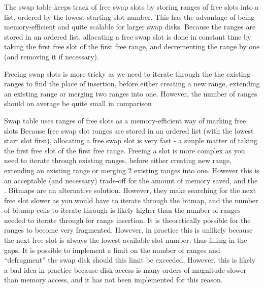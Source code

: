 The swap table keeps track of free swap slots by storing ranges of free slots into a list, ordered by the lowest starting slot number. This has the advantage of being memory-efficient and quite scalable for larger swap disks. Because the ranges are stored in an ordered list, allocating a free swap slot is done in constant time by taking the first free slot of the first free range, and decrementing the range by one (and removing it if necessary).

Freeing swap slots is more tricky as we need to iterate through the the existing ranges to find the place of insertion, before either creating a new range, extending an existing range or merging two ranges into one. However, the number of ranges should on average be quite small in comparison

Swap table
	uses ranges of free slots as a memory-efficient way of marking free slots
	Because free swap slot ranges are stored in an ordered list (with the lowest start slot first), allocating a free swap slot is very fast - a simple matter of taking the first free slot of the first free range.
	Freeing a slot is more complex as you need to iterate through existing ranges, before either creating new range, extending an existing range or merging 2 existing ranges into one. However this is an acceptable (and necessary) trade-off for the amount of memory saved, and the .
	Bitmaps are an alternative solution. However, they make searching for the next free slot slower as you would have to iterate through the bitmap, and the number of bitmap cells to iterate through is likely higher than the number of ranges needed to iterate through for range insertion.
	It is theoretically possible for the ranges to become very fragmented. However, in practice this is unlikely because the next free slot is always the lowest available slot number, thus filling in the gaps. It is possible to implement a limit on the number of ranges and ``defragment'' the swap disk should this limit be exceeded. However, this is likely a bad idea in practice because disk access is many orders of magnitude slower than memory access, and it has not been implemented for this reason.

